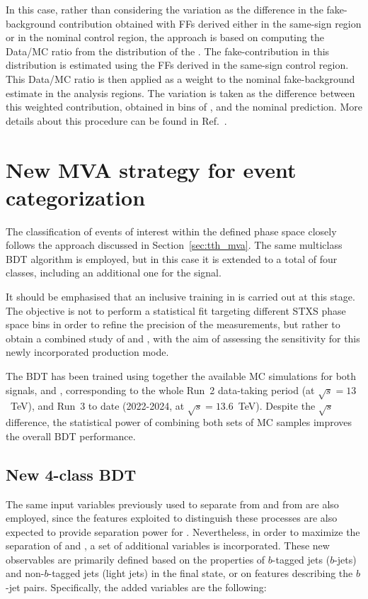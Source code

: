 In this case, rather than considering the variation as the difference in the fake-\tauhad background contribution obtained with FFs derived either in the same-sign region or in the nominal control region, the approach is based on computing the Data/MC ratio from the distribution of the \mmc. The fake-\tauhad contribution in this distribution is estimated using the FFs derived in the \tauhadhad same-sign control region. This Data/MC ratio is then applied as a weight to the nominal fake-\tauhad background estimate in the analysis regions. The variation is taken as the difference between this weighted contribution, obtained in bins of \mmc, and the nominal prediction. More details about this procedure can be found in Ref.~\cite{serhat_tesis}.

  


\FloatBarrier
\section{New MVA strategy for event categorization}

The classification of events of interest within the defined phase space closely follows the approach discussed in Section~\ref{sec:tth_mva}. The same multiclass BDT algorithm is employed, but in this case it is extended to a total of four classes, including an additional one for the \thtt signal.

It should be emphasised that an inclusive training in \pth is carried out at this stage. The objective is not to perform a statistical fit targeting different STXS phase space bins in order to refine the precision of the measurements, but rather to obtain a combined study of \ttH and \thqb, with the aim of assessing the sensitivity for this newly incorporated production mode.

The BDT has been trained using together the available MC simulations for both signals, \ztautau and \ttbar, corresponding to the whole Run~2 data-taking period (at $\sqrt{s}=13$~TeV), and Run~3 to date (2022-2024, at $\sqrt{s} = 13.6$~TeV).
Despite the $\sqrt{s}$ difference, the statistical power of combining both sets of MC samples improves the overall BDT performance.

\subsection{New 4-class BDT}
The same input variables previously used to separate \ttH from \ztautau and from \ttbar are also employed, since the features exploited to distinguish these processes are also expected to provide separation power for \thqb.
Nevertheless, in order to maximize the separation of \ttHtt and \thtt, a set of additional variables is incorporated. These new observables are primarily defined based on the properties of $b$-tagged jets ($b$-jets) and non-$b$-tagged jets (light jets) in the final state, or on features describing the $b$-jet pairs. Specifically, the added variables are the following:

